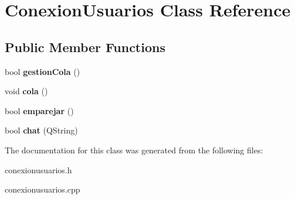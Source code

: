\hypertarget{classConexionUsuarios}{}\section{Conexion\+Usuarios Class Reference}
\label{classConexionUsuarios}
\subsection*{Public Member Functions}
\begin{DoxyCompactItemize}
\item 
\mbox{\label{classConexionUsuarios_af85e8405dc164011c44a9e11f76339a3}} 
bool {\bfseries gestion\+Cola} ()
\item 
\mbox{\label{classConexionUsuarios_af8652812a88c81f4c978ddc3f9c9ccf6}} 
void {\bfseries cola} ()
\item 
\mbox{\label{classConexionUsuarios_adfe8aaef7945b97b1356b2132d095c0c}} 
bool {\bfseries emparejar} ()
\item 
\mbox{\label{classConexionUsuarios_add8607e5a66d44542328b87dc59d1e2d}} 
bool {\bfseries chat} (Q\+String)
\end{DoxyCompactItemize}


The documentation for this class was generated from the following files\+:\begin{DoxyCompactItemize}
\item 
conexionusuarios.\+h\item 
conexionusuarios.\+cpp\end{DoxyCompactItemize}
